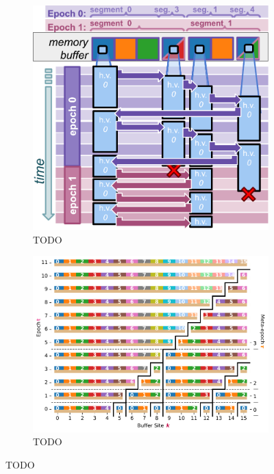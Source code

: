 \begin{figure}
  \centering
\begin{subfigure}{0.43\textwidth}
\includegraphics[width=\textwidth]{img/hsurf-tilted-intuition}
\caption{TODO}
\end{subfigure}%
\begin{subfigure}{0.57\textwidth}
\includegraphics[width=\textwidth]{binder/teeplots/20/surface-size=16+viz=site-reservation-at-ranks-heatmap+ext=}
\caption{TODO}
\end{subfigure}

\end{figure}
